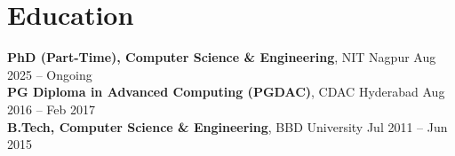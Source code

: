\documentclass[11pt,a4paper]{article}
\begin{document}
\section{Education}
\textbf{PhD (Part-Time), Computer Science \& Engineering}, NIT Nagpur \hfill Aug 2025 -- Ongoing \\
\textbf{PG Diploma in Advanced Computing (PGDAC)}, CDAC Hyderabad \hfill Aug 2016 -- Feb 2017 \\
\textbf{B.Tech, Computer Science \& Engineering}, BBD University \hfill Jul 2011 -- Jun 2015
\end{document}
